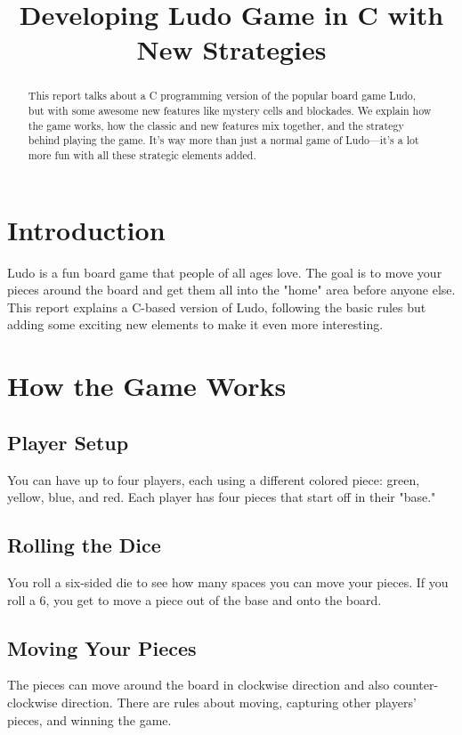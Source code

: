 \documentclass[12pt]{article}
\title{Developing Ludo Game in C with New Strategies}
\begin{document}
\maketitle

\begin{abstract}
This report talks about a C programming version of the popular board game Ludo, but with some awesome new features like mystery cells and blockades. We explain how the game works, how the classic and new features mix together, and the strategy behind playing the game. It's way more than just a normal game of Ludo—it's a lot more fun with all these strategic elements added.
\end{abstract}

\section{Introduction}
Ludo is a fun board game that people of all ages love. The goal is to move your pieces around the board and get them all into the "home" area before anyone else. This report explains a C-based version of Ludo, following the basic rules but adding some exciting new elements to make it even more interesting.

\section{How the Game Works}
\subsection{Player Setup}
You can have up to four players, each using a different colored piece: green, yellow, blue, and red. Each player has four pieces that start off in their "base."

\subsection{Rolling the Dice}
You roll a six-sided die to see how many spaces you can move your pieces. If you roll a 6, you get to move a piece out of the base and onto the board.

\subsection{Moving Your Pieces}
The pieces can move around the board in clockwise direction and also counter-clockwise direction. There are rules about moving, capturing other players' pieces, and winning the game.
\end{document}
